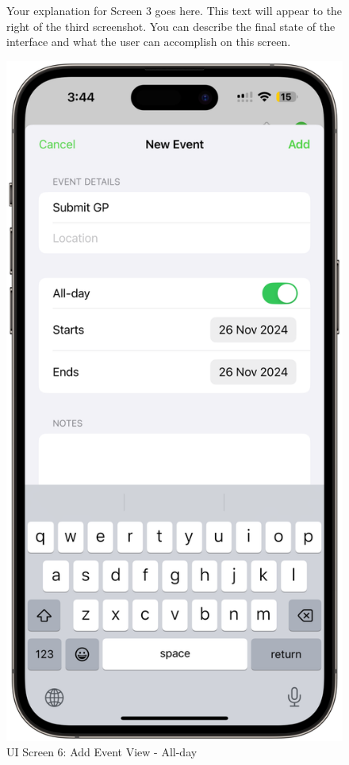 \begin{figure}[!h]
    \begin{minipage}{0.65\textwidth}
        Your explanation for Screen 3 goes here. This text will appear to the right 
        of the third screenshot. You can describe the final state of the interface 
        and what the user can accomplish on this screen.
    \end{minipage}
    \hfill
    \begin{minipage}{0.3\textwidth}
        \centering
        \includegraphics[width=\textwidth]{images/screen6.png}
        \caption{UI Screen 6: Add Event View - All-day}
        \label{fig:ui-screen-6}
    \end{minipage}
\end{figure}

